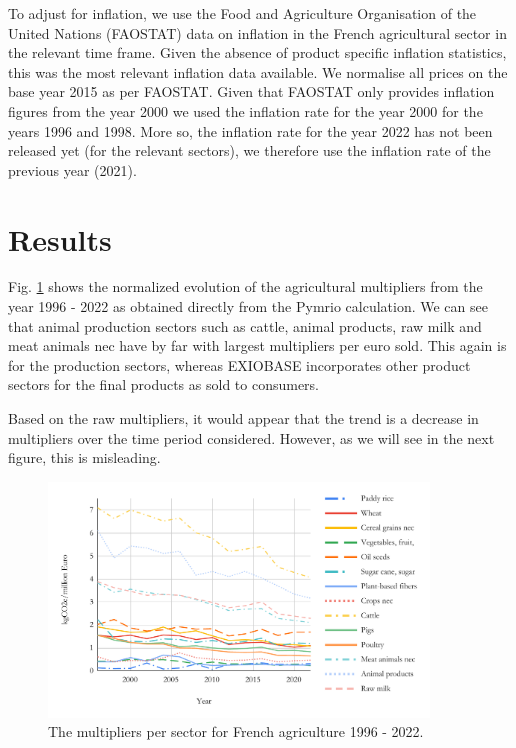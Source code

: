 \documentclass[a4paper,twoside]{article}
\begin{document}
To adjust for inflation, we use the Food and Agriculture Organisation of the United Nations (FAOSTAT) data on inflation in the French agricultural sector in the relevant time frame. Given the absence of product specific inflation statistics, this was the most relevant inflation data available. We normalise all prices on the base year 2015 as per FAOSTAT. Given that FAOSTAT only provides inflation figures from the year 2000 we used the inflation rate for the year 2000 for the years 1996 and 1998. More so, the inflation rate for the year 2022 has not been released yet (for the relevant sectors), we therefore use the inflation rate of the previous year (2021).

\section{Results}

Fig. \ref{fig:rawmultipliers} shows the normalized evolution of the agricultural multipliers from the year 1996 - 2022 as obtained directly from the Pymrio calculation. We can see that animal production sectors such as cattle, animal products, raw milk and meat animals nec have by far with largest multipliers per euro sold. This again is for the production sectors, whereas EXIOBASE incorporates other product sectors for the final products as sold to consumers.

Based on the raw multipliers, it would appear that the trend is a decrease in multipliers over the time period considered. However, as we will see in the next figure, this is misleading.

\begin{figure}[H]
\centering
\includegraphics[width=0.9\textwidth]{raw_multipliers}
\caption{The multipliers per sector for French agriculture 1996 - 2022.}\label{fig:rawmultipliers} 
\end{figure}
\end{document}
